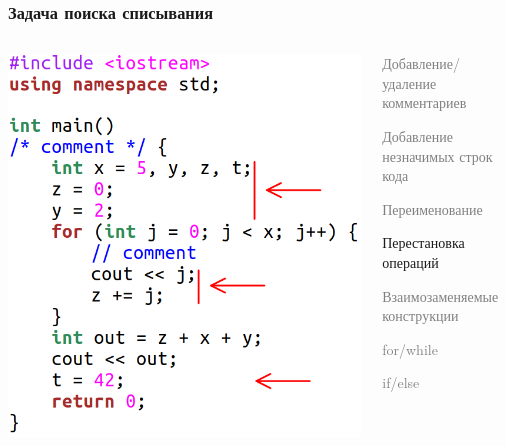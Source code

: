 \documentclass[10pt]{beamer}
\begin{document}
\begin{frame}[fragile]\frametitle{Задача поиска списывания}
	\centering
	\begin{columns}
		\centering
		\includegraphics[scale=0.7]{reordering.png}
		
		\centering
		\begin{itemize}
			\item \textcolor{gray}{Добавление/удаление комментариев
				\item Добавление незначимых строк кода
			\item Переименование}
				\item Перестановка операций
				\textcolor{gray}{
				\item Взаимозаменяемые конструкции
			}
			\begin{itemize}
				\item \textcolor{gray}{for/while
					\item if/else
				}
			\end{itemize}
		\end{itemize}
	\end{columns}
\end{frame}
\end{document}
